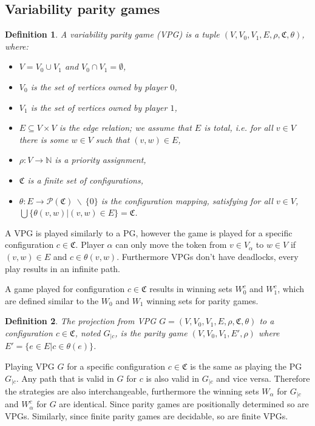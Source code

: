 \documentclass[]{article}
\newtheorem{definition}{Definition}[section]
\begin{document}
\subsection{Variability parity games}
\begin{definition}
	\label{def_VPG}
	A variability parity game (VPG) is a tuple $(V,V_0, V_1, E, \rho, \mathfrak{C}, \theta)$, where:
	\begin{itemize}
		\item $V = V_0 \cup V_1$ and $V_0 \cap V_1 = \emptyset$,
		\item $V_0$ is the set of vertices owned by player $0$,
		\item $V_1$ is the set of vertices owned by player $1$, 
		\item $E \subseteq V \times V$ is the edge relation; we assume that $E$ is total, i.e. for all $v\in V$ there is some $w \in V$ such that $(v,w) \in E$,
		\item $\rho :  V \rightarrow \mathbb{N}$ is a priority assignment,
		\item $\mathfrak{C}$ is a finite set of configurations,
		\item $\theta : E \rightarrow \mathcal{P}(\mathfrak{C})\ \backslash\ \{0\}$ is the configuration mapping, satisfying for all $v \in V$, $\bigcup\{\theta(v,w)|(v,w) \in E\} = \mathfrak{C}$.
	\end{itemize}
\end{definition}
A VPG is played similarly to a PG, however the game is played for a specific configuration $c \in \mathfrak{C}$. Player $\alpha$ can only move the token from $v \in V_\alpha$ to $w \in V$ if $(v,w) \in E$ and $c \in \theta(v,w)$. Furthermore VPGs don't have deadlocks, every play results in an infinite path.

A game played for configuration $c \in \mathfrak{C}$ results in winning sets $W_0^c$ and $W_1^c$, which are defined similar to the $W_0$ and $W_1$ winning sets for parity games.

\begin{definition}
	\label{def_VPG_proj} The projection from VPG $G = (V, V_0, V_1, E, \rho, \mathfrak{C}, \theta)$ to a configuration $c \in \mathfrak{C}$, noted $G_{|c}$, is the parity game $(V, V_0, V_1, E', \rho)$ where $E' = \{ e\in E | c \in \theta(e)\}$.
\end{definition}

Playing VPG $G$ for a specific configuration $c \in \mathfrak{C}$ is the same as playing the PG $G_{|c}$. Any path that is valid in $G$ for $c$ is also valid in $G_{|c}$ and vice versa. Therefore the strategies are also interchangeable, furthermore the winning sets $W_\alpha$ for $G_{|c}$ and $W_\alpha^c$ for $G$ are identical. Since parity games are positionally determined so are VPGs. Similarly, since finite parity games are decidable, so are finite VPGs.
\end{document}
